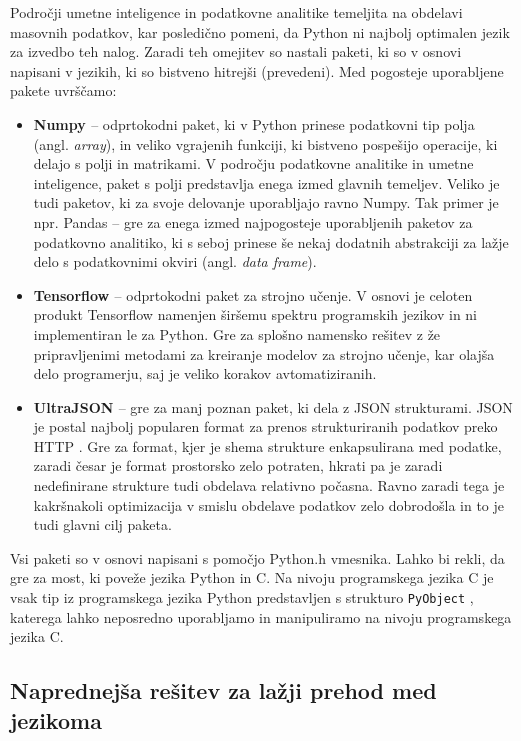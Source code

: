 \documentclass[a4paper,12pt,openright]{book}
\begin{document}
    Področji umetne inteligence in podatkovne analitike temeljita na obdelavi masovnih podatkov, kar posledično pomeni, da Python ni najbolj optimalen jezik za izvedbo teh nalog. Zaradi teh omejitev so nastali paketi, ki so v osnovi napisani v jezikih, ki so bistveno hitrejši (prevedeni). Med pogosteje uporabljene pakete uvrščamo:
    \begin{itemize}
        \item \textbf{Numpy \cite{NUMPY_GITHUB}} – odprtokodni paket, ki v Python prinese podatkovni tip polja (angl. \textit{array}), in veliko vgrajenih funkciji, ki bistveno pospešijo operacije, ki delajo s polji in matrikami. V področju podatkovne analitike in umetne inteligence, paket s polji predstavlja enega izmed glavnih temeljev. Veliko je tudi paketov, ki za svoje delovanje uporabljajo ravno Numpy. Tak primer je npr. Pandas \cite{PANDAS_GITHUB} – gre za enega izmed najpogosteje uporabljenih paketov za podatkovno analitiko, ki s seboj prinese še nekaj dodatnih abstrakciji za lažje delo s podatkovnimi okviri (angl. \textit{data frame}).
        \item \textbf{Tensorflow \cite{abadi2016tensorflow}} –  odprtokodni paket za strojno učenje. V osnovi je celoten produkt Tensorflow namenjen širšemu spektru programskih jezikov in ni implementiran le za Python. Gre za splošno namensko rešitev z že pripravljenimi metodami za kreiranje modelov za strojno učenje, kar olajša delo programerju, saj je veliko korakov avtomatiziranih.
        \item \textbf{UltraJSON \cite{UJSON_GITHUB}} – gre za manj poznan paket, ki dela z JSON strukturami. JSON je postal najbolj popularen format za prenos strukturiranih podatkov preko HTTP \cite{JSON_ACM}. Gre za format, kjer je shema strukture enkapsulirana med podatke, zaradi česar je format prostorsko zelo potraten, hkrati pa je zaradi nedefinirane strukture tudi obdelava relativno počasna. Ravno zaradi tega je kakršnakoli optimizacija v smislu obdelave podatkov zelo dobrodošla in to je tudi glavni cilj paketa.
    \end{itemize}

    \noindent
    Vsi paketi so v osnovi napisani s pomočjo Python.h vmesnika. Lahko bi rekli, da gre za most, ki poveže jezika Python in C. Na nivoju programskega jezika C je vsak tip iz programskega jezika Python predstavljen s strukturo {\tt PyObject} \cite{PY_OBJECT}, katerega lahko neposredno uporabljamo in manipuliramo na nivoju programskega jezika C. 

    \subsection{Naprednejša rešitev za lažji prehod med jezikoma}
\end{document}
